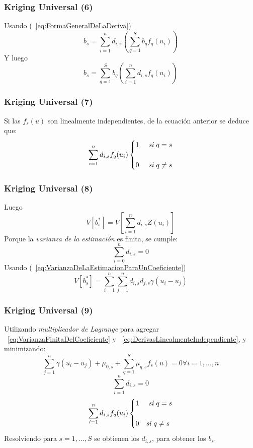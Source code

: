 \documentclass{beamer}
\begin{document}
\begin{frame}
\frametitle{Kriging Universal (6)}
Usando (~\ref{eq:FormaGeneralDeLaDeriva})
\begin{equation}
b_s = \sum_{i=1}^n d_{i,s} \left(\sum_{q=1}^S b_q f_q(u_i)\right)
\end{equation}
Y luego
\begin{equation}
b_s =  \sum_{q=1}^S b_q \left(\sum_{i=1}^n d_{i,s} f_q(u_i)\right)
\end{equation}
\end{frame}

\begin{frame}
\frametitle{Kriging Universal (7)}
Si las $f_s(u)$ son linealmente independientes, de la ecuación anterior se deduce que:
\begin{equation}
\label{eq:DerivasLinealmenteIndependiente}
\sum_{i=1}^n d_{i,s} f_q(u_i)
\begin{cases}1 &\textit{ si $q = s$} \cr\cr
0 &\textit{ si $q \not= s$}\end{cases}
\end{equation}
\end{frame}

\begin{frame}
\frametitle{Kriging Universal (8)}
Luego
\begin{equation}
\label{eq:VarianzaDeLaEstimacionParaUnCoeficiente}
V[b_s^*] = V\left[\sum_{i=1}^n d_{i,s} Z(u_i)\right]
\end{equation}
Porque la \emph{varianza de la estimación} es finita, se cumple:
\begin{equation}
\label{eq:VarianzaFinitaDelCoeficiente}
\sum_{i=0}^n d_{i,s} = 0
\end{equation}
Usando (~\ref{eq:VarianzaDeLaEstimacionParaUnCoeficiente})
\begin{equation}
V[b_s^*]=\sum_{i=1}^n \sum_{j=1}^n d_{i,s} d_{j,s} \gamma(u_i - u_j)
\end{equation}
\end{frame}

\begin{frame}
\frametitle{Kriging Universal (9)}
Utilizando \emph{multiplicador de Lagrange} para agregar ~\ref{eq:VarianzaFinitaDelCoeficiente} y ~\ref{eq:DerivasLinealmenteIndependiente}, y minimizando:
\begin{equation}
\sum_{j=1}^n \gamma(u_i - u_j) + \mu_{0,s} + \sum_{q=1}^S \mu_{q,s} f_s(u) = 0 \forall i = 1,...,n
\end{equation}
\begin{equation}
\sum_{i=1}^n d_{i,s} = 0
\end{equation}
\begin{equation}
\sum_{i=1}^n d_{i,s} f_q(u_i) \begin{cases}1 & \textit{ si $q = s$} \cr\cr 0 & \textit{si $q \not = s$} \end{cases}
\end{equation}
Resolviendo para $s= 1,...,S$ se obtienen los $d_{i,s}$, para obtener los $b_s$.
\end{frame}
\end{document}
